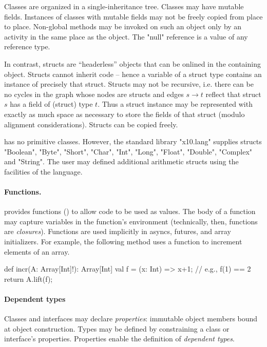 Classes are organized in a single-inheritance tree. Classes may have
mutable fields.  Instances of classes with mutable fields may not be
freely copied from place to place. Non-global methods may be invoked
on such an object only by an activity in the same place as the object.
The \xcd"null" reference is a value of any reference type.

In contrast, structs are ``headerless'' objects that can be onlined in
the containing object.  Structs cannot inherit code -- hence a
variable of a struct type contains an instance of precisely that
struct. Structs may not be recursive, i.e.{} there can be no cycles in
the graph whose nodes are structs and edges $s \rightarrow t$ reflect
that struct $s$ has a field of (struct) type $t$. Thus a struct
instance may be represented with exactly as much space as necessary to
store the fields of that struct (modulo alignment considerations). Structs
can be copied freely.

\Xten{} has no primitive classes. However, the standard library
\xcd"x10.lang" supplies structs \xcd"Boolean", \xcd"Byte",
\xcd"Short", \xcd"Char", \xcd"Int", \xcd"Long", \xcd"Float",
\xcd"Double", \xcd"Complex" and \xcd"String". The user may defined
additional arithmetic structs using the facilities of the
language.

\paragraph{Functions.}
\Xten{} provides functions () to allow code to be used
as values.  The body of a function may capture variables in the
function's environment (technically, then, functions are {\em
  closures}).  Functions are used implicitly in asyncs, futures, and
array initializers.
%
For example, the following method uses a function to increment
elements of an array.
\begin{xten}
def incr(A: Array[Int]!): Array[Int] {
    val f = (x: Int) => x+1; // e.g., f(1) == 2
    return A.lift(f);
}
\end{xten}

\paragraph{Dependent types}
Classes and interfaces may declare \emph{properties}: immutable object members bound at object construction.
Types may be defined by constraining a
class or interface's properties.
Properties enable the definition of \emph{dependent types}.

